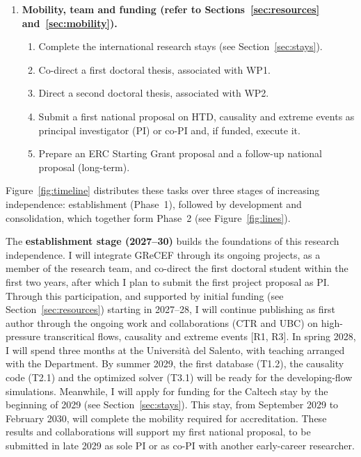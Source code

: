 \documentclass[11pt]{article}
\begin{document}
\begin{enumerate}[label=\textbf{WP\arabic*}, leftmargin=*]
\begin{enumerate}[label=T3.\arabic*, leftmargin=*, nosep]
  \end{enumerate}
  \item \textbf{Mobility, team and funding (refer to Sections~\ref{sec:resources} and~\ref{sec:mobility}).}
  \begin{enumerate}[label=T4.\arabic*, leftmargin=*, nosep]
    \item Complete the international research stays (see Section~\ref{sec:stays}).
    \item Co-direct a first doctoral thesis, associated with WP1.
    \item Direct a second doctoral thesis, associated with WP2.
    \item Submit a first national proposal on HTD, causality and extreme events as principal investigator (PI) or co-PI and, if funded, execute it.
    \item Prepare an ERC Starting Grant proposal and a follow-up national proposal (long-term).
  \end{enumerate}
\end{enumerate}

Figure~\ref{fig:timeline} distributes these tasks over three stages of increasing independence: establishment (Phase~1), followed by development and consolidation, which together form Phase~2 (see Figure~\ref{fig:lines}).

The \textbf{establishment stage (2027--30)} builds the foundations of this research independence. 
I will integrate GReCEF through its ongoing projects, as a member of the research team, and co-direct the first doctoral student within the first two years, after which I plan to submit the first project proposal as PI. 
Through this participation, and supported by initial funding (see Section~\ref{sec:resources}) starting in 2027--28, I will continue publishing as first author through the ongoing work and collaborations (CTR and UBC) on high-pressure transcritical flows, causality and extreme events [R1, R3]. 
In spring 2028, I will spend three months at the Universit\`a del Salento, with teaching arranged with the Department. 
By summer 2029, the first database (T1.2), the causality code (T2.1) and the optimized solver (T3.1) will be ready for the developing-flow simulations. 
Meanwhile, I will apply for funding for the Caltech stay by the beginning of 2029 (see Section~\ref{sec:stays}). 
This stay, from September 2029 to February 2030, will complete the mobility required for accreditation. 
These results and collaborations will support my first national proposal, to be submitted in late 2029 as sole PI or as co-PI with another early-career researcher.
\end{document}
